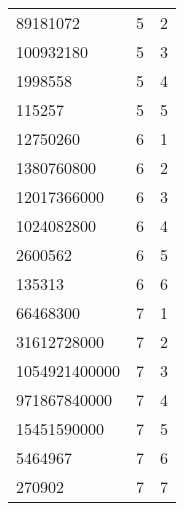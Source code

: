 \begin{table}[H]
\begin{tabular}{lll}
89181072                                    & 5                                      & 2                                      \\
100932180                                   & 5                                      & 3                                      \\
1998558                                     & 5                                      & 4                                      \\
115257                                      & 5                                      & 5                                      \\
12750260                                    & 6                                      & 1                                      \\
1380760800                                  & 6                                      & 2                                      \\
12017366000                                 & 6                                      & 3                                      \\
1024082800                                  & 6                                      & 4                                      \\
2600562                                     & 6                                      & 5                                      \\
135313                                      & 6                                      & 6                                      \\
66468300                                    & 7                                      & 1                                      \\
31612728000                                 & 7                                      & 2                                      \\
1054921400000                               & 7                                      & 3                                      \\
971867840000                                & 7                                      & 4                                      \\
15451590000                                 & 7                                      & 5                                      \\
5464967                                     & 7                                      & 6                                      \\
270902                                      & 7                                      & 7                                      
\end{tabular}
\end{table}
